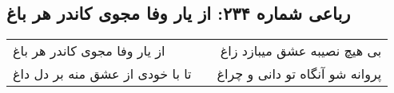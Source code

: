 \begin{center}
\section*{رباعی شماره ۲۳۴: از یار وفا مجوی کاندر هر باغ}
\label{sec:sh234}
\begin{longtable}{l p{0.5cm} r}
از یار وفا مجوی کاندر هر باغ
&&
بی هیچ نصیبه عشق میبازد زاغ
\\
تا با خودی از عشق منه بر دل داغ
&&
پروانه شو آنگاه تو دانی و چراغ
\\
\end{longtable}
\end{center}

